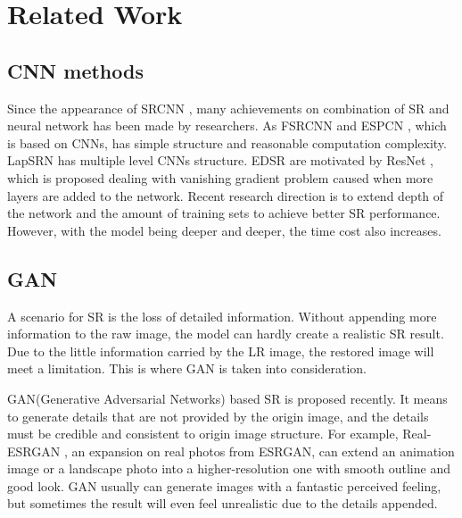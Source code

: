 \documentclass{article}
\begin{document}
  
  \section{Related Work}
  \subsection{CNN methods}
  Since the appearance of SRCNN \cite{6}, many achievements on combination of SR and neural network has been made by researchers. 
  As FSRCNN \cite{1} and ESPCN \cite{2}, which is based on CNNs, has simple structure and reasonable computation complexity. 
  LapSRN \cite{3} has multiple level CNNs structure. 
  EDSR \cite{4} are motivated by ResNet \cite{7}, which is proposed dealing with vanishing gradient problem caused when more layers are added to the network.
  Recent research direction is to extend depth of the network and the amount of training sets to achieve better SR performance.
  However, with the model being deeper and deeper, the time cost also increases.
  
  \subsection{GAN}
  A scenario for SR is the loss of detailed information. 
  Without appending more information to the raw image, the model can hardly create a realistic SR result.
  Due to the little information carried by the LR image, the restored image will meet a limitation.
  This is where GAN is taken into consideration.
  
  GAN(Generative Adversarial Networks) based SR is proposed recently. 
  It means to generate details that are not provided by the origin image, and the details must be credible and consistent to origin image structure.
  For example, Real-ESRGAN \cite{5}, an expansion on real photos from ESRGAN, can extend an animation image or a landscape photo into a higher-resolution one with smooth outline and good look.
  GAN usually can generate images with a fantastic perceived feeling, but sometimes the result will even feel unrealistic due to the details appended.
  
\end{document}
